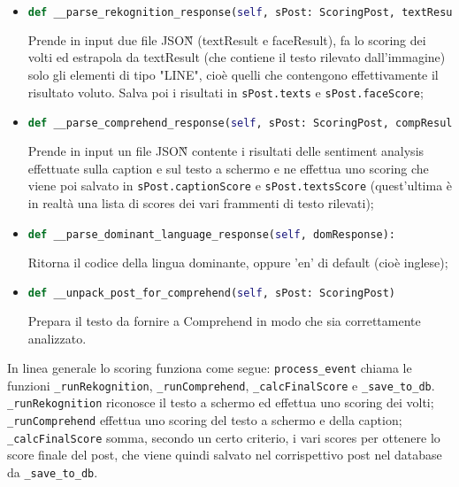 \begin{itemize}
\item 
\begin{lstlisting}[language=Python, numbers=none]
def __parse_rekognition_response(self, sPost: ScoringPost, textResult, faceResult):
\end{lstlisting}
Prende in input due file JSON\G{} (textResult e faceResult), fa lo scoring dei volti ed estrapola 
da textResult (che contiene il testo rilevato dall'immagine) solo gli elementi di tipo "LINE", 
cioè quelli che contengono effettivamente il risultato voluto.
Salva poi i risultati in \verb+sPost.texts+ e \verb+sPost.faceScore+;

\item 
\begin{lstlisting}[language=Python, numbers=none]
def __parse_comprehend_response(self, sPost: ScoringPost, compResult):
\end{lstlisting}
Prende in input un file JSON\G{} contente i risultati delle sentiment analysis effettuate 
sulla caption e sul testo a schermo e ne effettua uno scoring che viene poi salvato 
in \verb+sPost.captionScore+ e \verb+sPost.textsScore+ (quest'ultima è in realtà una lista 
di scores dei vari frammenti di testo rilevati);

\item 
\begin{lstlisting}[language=Python, numbers=none]
def __parse_dominant_language_response(self, domResponse):
\end{lstlisting}
Ritorna il codice della lingua dominante, oppure 'en' di default (cioè inglese);

\item 
\begin{lstlisting}[language=Python, numbers=none]
def __unpack_post_for_comprehend(self, sPost: ScoringPost)
\end{lstlisting}
Prepara il testo da fornire a Comprehend in modo che sia correttamente analizzato.
\end{itemize}
In linea generale lo scoring funziona come segue:
\verb+process_event+ chiama le funzioni \verb+_runRekognition+, \verb+_runComprehend+,
\verb+_calcFinalScore+ e \verb+_save_to_db+.\\
\verb+_runRekognition+ riconosce il testo a schermo ed effettua uno scoring dei volti;\\
\verb+_runComprehend+ effettua uno scoring del testo a schermo e della caption;\\
\verb+_calcFinalScore+ somma, secondo un certo criterio, i vari scores per ottenere lo score
finale del post, che viene quindi salvato nel corrispettivo post nel database da \verb+_save_to_db+.
